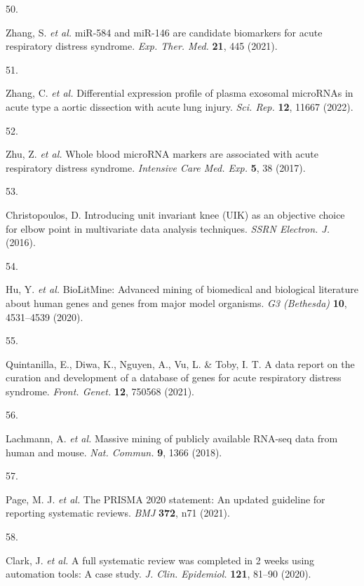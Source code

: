 \documentclass[
  11,
  a4paper,
]{article}
\newlength{\cslhangindent}
\newlength{\csllabelwidth}
\newlength{\cslentryspacingunit} %
\newenvironment{CSLReferences}[2] %
 {%
  \setlength{\parindent}{0pt}
  \ifodd #1
  \let\oldpar\par
  \def\par{\hangindent=\cslhangindent\oldpar}
  \fi
  \setlength{\parskip}{#2\cslentryspacingunit}
 }%
 {}
\newcommand{\CSLLeftMargin}[1]{\parbox[t]{\csllabelwidth}{#1}}
\newcommand{\CSLRightInline}[1]{\parbox[t]{\linewidth - \csllabelwidth}{#1}\break}
\begin{document}
\begin{CSLReferences}{0}{0}
\leavevmode{}%
\CSLLeftMargin{50. }%
\CSLRightInline{Zhang, S. \emph{et al.} miR-584 and miR-146 are
candidate biomarkers for acute respiratory distress syndrome. \emph{Exp.
Ther. Med.} \textbf{21}, 445 (2021).}

\leavevmode{}%
\CSLLeftMargin{51. }%
\CSLRightInline{Zhang, C. \emph{et al.} Differential expression profile
of plasma exosomal {microRNAs} in acute type a aortic dissection with
acute lung injury. \emph{Sci. Rep.} \textbf{12}, 11667 (2022).}

\leavevmode{}%
\CSLLeftMargin{52. }%
\CSLRightInline{Zhu, Z. \emph{et al.} Whole blood {microRNA} markers are
associated with acute respiratory distress syndrome. \emph{Intensive
Care Med. Exp.} \textbf{5}, 38 (2017).}

\leavevmode{}%
\CSLLeftMargin{53. }%
\CSLRightInline{Christopoulos, D. Introducing unit invariant knee
({UIK}) as an objective choice for elbow point in multivariate data
analysis techniques. \emph{SSRN Electron. J.} (2016).}

\leavevmode{}%
\CSLLeftMargin{54. }%
\CSLRightInline{Hu, Y. \emph{et al.} {BioLitMine}: Advanced mining of
biomedical and biological literature about human genes and genes from
major model organisms. \emph{G3 (Bethesda)} \textbf{10}, 4531--4539
(2020).}

\leavevmode{}%
\CSLLeftMargin{55. }%
\CSLRightInline{Quintanilla, E., Diwa, K., Nguyen, A., Vu, L. \& Toby,
I. T. A data report on the curation and development of a database of
genes for acute respiratory distress syndrome. \emph{Front. Genet.}
\textbf{12}, 750568 (2021).}

\leavevmode{}%
\CSLLeftMargin{56. }%
\CSLRightInline{Lachmann, A. \emph{et al.} Massive mining of publicly
available {RNA-seq} data from human and mouse. \emph{Nat. Commun.}
\textbf{9}, 1366 (2018).}

\leavevmode{}%
\CSLLeftMargin{57. }%
\CSLRightInline{Page, M. J. \emph{et al.} The {PRISMA} 2020 statement:
An updated guideline for reporting systematic reviews. \emph{BMJ}
\textbf{372}, n71 (2021).}

\leavevmode{}%
\CSLLeftMargin{58. }%
\CSLRightInline{Clark, J. \emph{et al.} A full systematic review was
completed in 2 weeks using automation tools: A case study. \emph{J.
Clin. Epidemiol.} \textbf{121}, 81--90 (2020).}


\end{CSLReferences}
\end{document}
